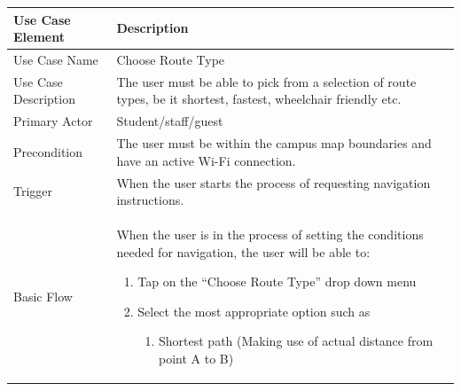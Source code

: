 \documentclass[12pt]{article}
\begin{document}
	\begin{tabular}{|p{4cm}|p{10cm}|}

\hline



Use Case Element & Description \\

\hline



Use Case Name & 

Choose Route Type \\

\hline



Use Case Description & 

The user must be able to pick from a selection of route types, be it shortest, fastest, wheelchair friendly etc.   \\

\hline



Primary Actor & 

Student/staff/guest \\

\hline



Precondition & 

The user must be within the campus map boundaries and have an active Wi-Fi connection.   \\

\hline



Trigger & 

When the user starts the process of requesting navigation instructions.   \\

\hline



Basic Flow & 

When the user is in the process of setting the conditions needed for navigation, the user will be able to:

\begin{enumerate}

\item Tap on the “Choose Route Type” drop down menu

\item Select the most appropriate option such as

	\begin{enumerate}

	\item Shortest path (Making use of actual distance from point A to B)


\end{enumerate}
\end{enumerate}
\end{tabular}
\end{document}
